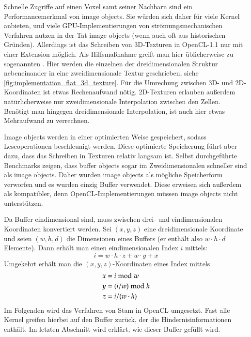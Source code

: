 Schnelle Zugriffe auf einen Voxel samt seiner Nachbarn sind ein
Performancemerkmal von image objects. Sie würden sich daher für viele Kernel
anbieten, und viele GPU-Implementierungen von
strömungsmechanischen Verfahren nutzen in der Tat image objects (wenn auch
oft aus historischen Gründen). Allerdings ist das Schreiben von
3D-Texturen in OpenCL-1.1 nur mit einer Extension möglich. Als
Hilfsmaßnahme greift man hier üblicherweise zu sogenannten
 \cite{Harris2003}. Hier werden die
einzelnen  der dreidimensionalen Struktur
nebeneinander in eine zweidimensionale Textur geschrieben, siehe
\autoref{fig:implementation_flat_3d_texture}. Für die Umrechung
zwischen 3D- und 2D-Koordinaten ist etwas Rechenaufwand
nötig. 2D-Texturen erlauben außerdem natürlicherweise nur
zweidimensionale Interpolation zwischen den Zellen. Benötigt man
hingegen dreidimensionale Interpolation, ist auch hier etwas
Mehraufwand zu verrechnen.

Image objects werden in einer optimierten Weise gespeichert, sodass
Leseoperationen beschleunigt werden. Diese optimierte Speicherung
führt aber dazu, dass das Schreiben in Texturen relativ langsam
ist. Selbst durchgeführte Benchmarks zeigen, dass buffer objects sogar im
Zweidimensionalen schneller sind als image objects. Daher wurden image objects
als mögliche Speicherform verworfen und es wurden einzig Buffer
verwendet. Diese erweisen sich außerdem als kompatibler, denn
OpenCL-Implementierungen müssen image objects nicht unterstützen.

Da Buffer eindimensional sind, muss zwischen drei- und
eindimensionalen Koordinaten konvertiert werden. Sei $(x,y,z)$ eine
dreidimensionale Koordinate und seien $(w,h,d)$ die Dimensionen eines
Buffers (er enthält also $w \cdot h \cdot d$ Elemente). Dann erhält
man einen eindimensionalen Index $i$ mittels:
\begin{equation}
\label{eq:implementation_wind_3d_to_2d}
i = w \cdot h \cdot z + w \cdot y + x
\end{equation}
Umgekehrt erhält man die $(x,y,z)$-Koordinaten eines Index mittels
\begin{equation}
\begin{split}
x &= i \bmod w \\
y &= (i / w) \bmod h \\
z &= i / (w \cdot h)  \\
\end{split}
\end{equation}
Im Folgenden wird das Verfahren von Stam in OpenCL umgesetzt. Fast
alle Kernel greifen hierbei auf den Buffer zurück, der die
Hindernisinformationen enthält. Im letzten Abschnitt wird erklärt, wie
dieser Buffer gefüllt wird.

